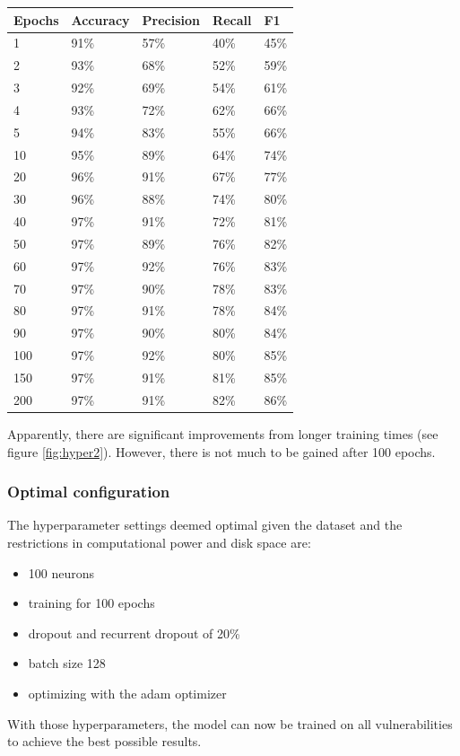 \documentclass[
a4paper,
pagesize,
pdftex,
12pt,
twoside, %
BCOR=5mm, %
ngerman,
fleqn,
final,
]{scrartcl}
\begin{document}
	\begin{tabular}{ | p{2cm} || p{2cm}|p{2cm}|p{2cm}|p{2cm}|  }
		\hline
		Epochs & Accuracy & Precision & Recall & F1 \\
		\hline
		1 & 91\% &  57\% &  40\% &  45\% \\
		2 & 93\% &  68\% &  52\% &  59\% \\
		3 &  92\%&  69\%&   54\%&  61\% \\
		4 &  93\%&  72\%&   62\%&  66\% \\
		5 &  94\%&  83\%&   55\%&  66\% \\
		10 &  95\%&  89\%&   64\%&  74\% \\
		20 &  96\%&  91\%&   67\%&  77\% \\
		30 &  96\%&  88\%&   74\%&  80\% \\
		40 &  97\%&  91\%&   72\%&  81\% \\
		50 &  97\%&  89\%&   76\%&  82\% \\
		60 &  97\%&  92\%&   76\%&  83\% \\
		70 &  97\%&  90\%&   78\%&  83\% \\
		80 &  97\%&  91\%&   78\%&  84\% \\
		90 &  97\%&  90\%&   80\%&  84\% \\
		100 &  97\%&  92\%&   80\%&  85\% \\
		150 &  97\%&  91\%&   81\%&  85\% \\
		200 &  97\%&  91\%&   82\%&  86\% \\
		\hline
		\hline
	\end{tabular}
	
	Apparently, there are significant improvements from longer training times (see figure \ref{fig:hyper2}). However, there is not much to be gained after 100 epochs.
	
	\subsubsection{Optimal configuration}
	
	The hyperparameter settings deemed optimal given the dataset and the restrictions in computational power and disk space are:
	\begin{itemize}
		\item 100 neurons
		\item training for 100 epochs
		\item dropout and recurrent dropout of 20\%
		\item batch size 128
		\item optimizing with the adam optimizer
	\end{itemize}
	With those hyperparameters, the model can now be trained on all vulnerabilities to achieve the best possible results.
	
\end{document}
